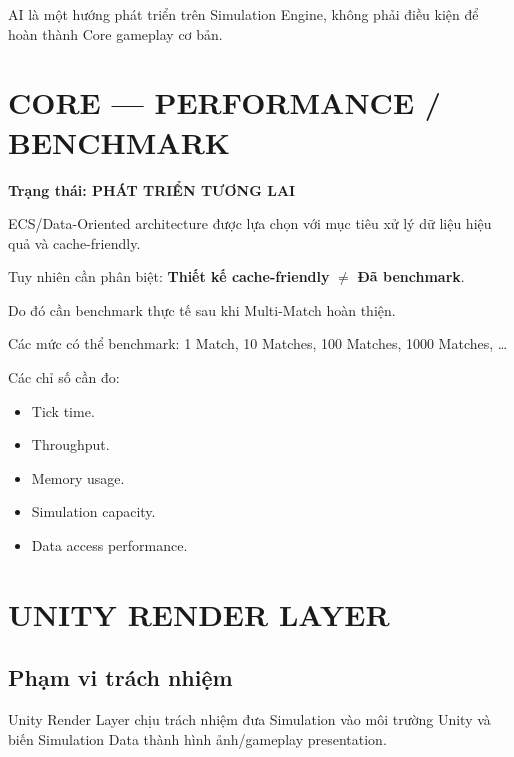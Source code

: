 \documentclass[12pt,a4paper]{article}
\begin{document}
AI là một hướng phát triển trên Simulation Engine, không phải điều kiện để hoàn thành Core gameplay cơ bản.

\section{CORE --- PERFORMANCE / BENCHMARK}
\textbf{Trạng thái: PHÁT TRIỂN TƯƠNG LAI}

ECS/Data-Oriented architecture được lựa chọn với mục tiêu xử lý dữ liệu hiệu quả và cache-friendly.

Tuy nhiên cần phân biệt: \textbf{Thiết kế cache-friendly} $\neq$ \textbf{Đã benchmark}.

Do đó cần benchmark thực tế sau khi Multi-Match hoàn thiện.

Các mức có thể benchmark: 1 Match, 10 Matches, 100 Matches, 1000 Matches, \ldots

Các chỉ số cần đo:
\begin{itemize}[nosep]
  \item Tick time.
  \item Throughput.
  \item Memory usage.
  \item Simulation capacity.
  \item Data access performance.
\end{itemize}

\section{UNITY RENDER LAYER}

\subsection*{Phạm vi trách nhiệm}

Unity Render Layer chịu trách nhiệm đưa Simulation vào môi trường Unity và biến Simulation Data thành hình ảnh/gameplay presentation.
\end{document}
